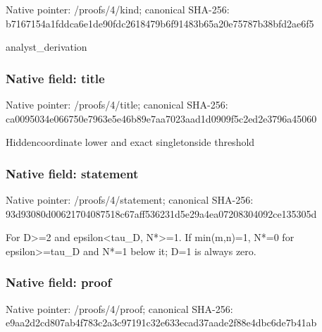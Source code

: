 \documentclass[10pt,a4paper]{article}
\begin{document}
Native pointer: /proofs/4/kind; canonical SHA-256: b7167154a1fddca6e1de90fd\allowbreak{}c2618479b6f91483b65a20e7\allowbreak{}5787b38bfd2ae6f5


analyst\_derivation


\subsubsection{Native field: title}


Native pointer: /proofs/4/title; canonical SHA-256: ca0095034e066750e7963e5e\allowbreak{}46b89e7aa7023aad1d0909f5\allowbreak{}c2ed2e3796a45060


Hiddencoordinate lower and exact singletonside threshold


\subsubsection{Native field: statement}


Native pointer: /proofs/4/statement; canonical SHA-256: 93d93080d00621704087518c\allowbreak{}67aff536231d5e29a4ea0720\allowbreak{}8304092ce135305d


For D>=2 and epsilon<tau\_D, N*>=1. If min(m,n)=1, N*=0 for epsilon>=tau\_D and N*=1 below it; D=1 is always zero.


\subsubsection{Native field: proof}


Native pointer: /proofs/4/proof; canonical SHA-256: e9aa2d2cd807ab4f783c2a3c\allowbreak{}97191c32e633ecad37aade2f\allowbreak{}88e4dbc6de7b41ab
\end{document}
